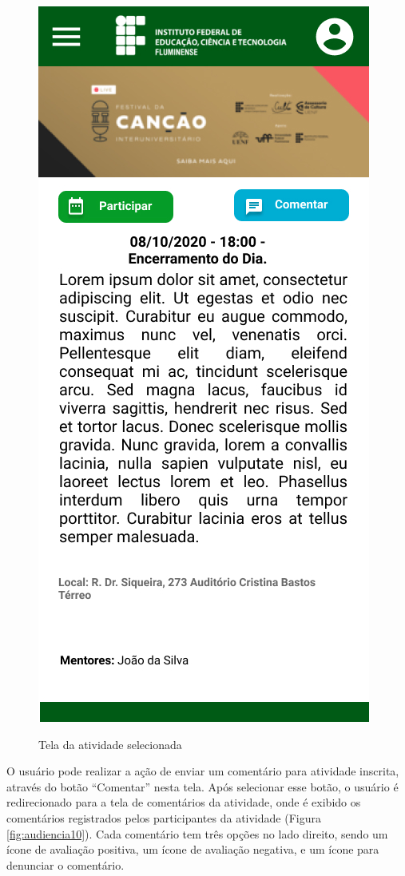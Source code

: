 \begin{figure}[H]
    \centering
    \caption{Tela da atividade selecionada}
    \includegraphics[scale=0.44]{figuras/Audiencia/9-Ativade.jpg}
    \label{fig:audiencia9}
\end{figure}

O usuário pode realizar a ação de enviar um comentário para atividade inscrita, através do botão “Comentar” nesta tela. Após selecionar esse botão, o usuário é redirecionado para a tela de comentários da atividade, onde é exibido os comentários registrados pelos participantes da atividade (Figura \ref{fig:audiencia10}). Cada comentário tem três opções no lado direito, sendo um ícone de avaliação positiva, um ícone de avaliação negativa, e um ícone para denunciar o comentário.

